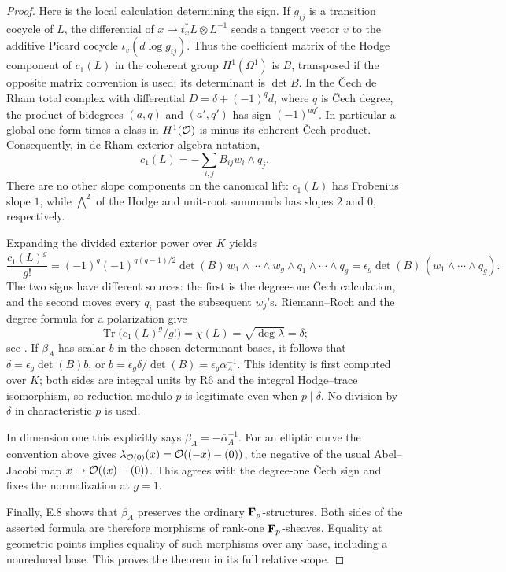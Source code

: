 \begin{proof}
Here is the local calculation determining the sign.  If $g_{ij}$ is a transition cocycle of $L$, the differential of
$x\mapsto t_x^*L\otimes L^{-1}$ sends a tangent vector $v$ to the additive Picard cocycle $\iota_v(d\log g_{ij})$.  Thus the coefficient matrix of the Hodge component of $c_1(L)$ in the coherent group $H^1(\Omega^1)$ is $B$, transposed if the opposite matrix convention is used; its determinant is $\det B$.  In the \v Cech de Rham total complex with differential
$D=\delta+(-1)^q d$, where $q$ is \v Cech degree, the product of bidegrees $(a,q)$ and $(a',q')$ has sign $(-1)^{a q'}$.  In particular a global one-form times a class in $H^1(\mathcal O)$ is minus its coherent \v Cech product.  Consequently, in de Rham exterior-algebra notation,
\[
                         c_1(L)=-\sum_{i,j}B_{ij}w_i\wedge q_j.
\]
There are no other slope components on the canonical lift: $c_1(L)$ has Frobenius slope $1$, while $\bigwedge^2$ of the Hodge and unit-root summands has slopes $2$ and $0$, respectively.

Expanding the divided exterior power over $K$ yields
\[
 \frac{c_1(L)^g}{g!}
 =(-1)^g(-1)^{g(g-1)/2}\det(B)\,
      w_1\wedge\cdots\wedge w_g\wedge q_1\wedge\cdots\wedge q_g
 =\epsilon_g\det(B)\,(w_1\wedge\cdots\wedge q_g).
\]
The two signs have different sources: the first is the degree-one \v Cech calculation, and the second moves every $q_i$ past the subsequent $w_j$'s.  Riemann--Roch and the degree formula for a polarization give
\[
 \operatorname{Tr}\bigl(c_1(L)^g/g!\bigr)
                         =\chi(L)=\sqrt{\deg\lambda}=\delta;
\]
see \cite[\S16, Riemann--Roch theorem, p.~150]{Mumford1970}.
If $\beta_A$ has scalar $b$ in the chosen determinant bases, it follows that
$\delta=\epsilon_g\det(B)b$, or
$b=\epsilon_g\delta/\det(B)=\epsilon_g\alpha_A^{-1}$.
This identity is first computed over $K$; both sides are integral units by R6 and the integral Hodge--trace isomorphism, so reduction modulo $p$ is legitimate even when $p\mid\delta$.  No division by $\delta$ in characteristic $p$ is used.

In dimension one this explicitly says $\beta_A=-\overline\alpha_A^{-1}$.  For an elliptic curve the convention above gives
$\lambda_{\mathcal O(0)}(x)=\mathcal O((-x)-(0))$, the negative of the usual Abel--Jacobi map $x\mapsto\mathcal O((x)-(0))$.  This agrees with the degree-one \v Cech sign and fixes the normalization at $g=1$.

Finally, E.8 shows that $\beta_A$ preserves the ordinary $\mathbf F_p$-structures.  Both sides of the asserted formula are therefore morphisms of rank-one \etale $\mathbf F_p$-sheaves.  Equality at geometric points implies equality of such morphisms over any base, including a nonreduced base.  This proves the theorem in its full relative scope.
\end{proof}

